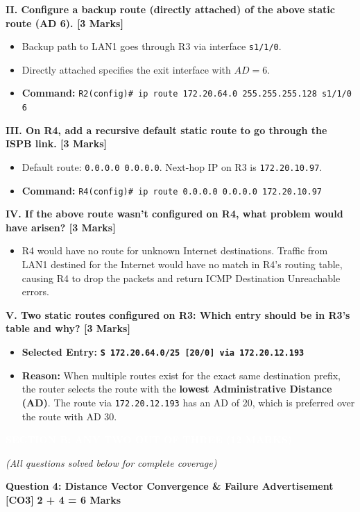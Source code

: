 \documentclass[11pt,a4paper]{article}
\newcommand{\questionheader}[3]{
    \vspace{0.35cm}
    \noindent\colorbox{qboxbg}{
        \parbox{\dimexpr\textwidth-2\fboxsep\relax}{
            \textbf{\textcolor{primary}{\large #1}} \hfill \textbf{\textcolor{accent}{[#2]}} \hfill \textbf{\textcolor{secondary}{#3 Marks}}
        }
    }
    \vspace{0.15cm}
}
\newcommand{\sectionbanner}[1]{
    \vspace{0.5cm}
    \noindent\colorbox{primary}{
        \parbox{\dimexpr\textwidth-2\fboxsep\relax}{
            \centering \textbf{\textcolor{white}{\Large #1}}
        }
    }
    \vspace{0.25cm}
}
\begin{document}
\textbf{II. Configure a backup route (directly attached) of the above static route (AD 6). [3 Marks]}
\begin{itemize}
    \item Backup path to LAN1 goes through R3 via interface \texttt{s1/1/0}.
    \item Directly attached specifies the exit interface with $AD = 6$.
    \item \textbf{Command:} \texttt{R2(config)\# ip route 172.20.64.0 255.255.255.128 s1/1/0 6}
\end{itemize}

\textbf{III. On R4, add a recursive default static route to go through the ISPB link. [3 Marks]}
\begin{itemize}
    \item Default route: \texttt{0.0.0.0 0.0.0.0}. Next-hop IP on R3 is \texttt{172.20.10.97}.
    \item \textbf{Command:} \texttt{R4(config)\# ip route 0.0.0.0 0.0.0.0 172.20.10.97}
\end{itemize}

\textbf{IV. If the above route wasn't configured on R4, what problem would have arisen? [3 Marks]}
\begin{itemize}
    \item R4 would have no route for unknown Internet destinations. Traffic from LAN1 destined for the Internet would have no match in R4's routing table, causing R4 to drop the packets and return ICMP Destination Unreachable errors.
\end{itemize}

\textbf{V. Two static routes configured on R3: Which entry should be in R3's table and why? [3 Marks]}
\begin{itemize}
    \item \textbf{Selected Entry:} \textbf{\texttt{S 172.20.64.0/25 [20/0] via 172.20.12.193}}
    \item \textbf{Reason:} When multiple routes exist for the exact same destination prefix, the router selects the route with the \textbf{lowest Administrative Distance (AD)}. The route via \texttt{172.20.12.193} has an AD of 20, which is preferred over the route with AD 30.
\end{itemize}

\newpage
\sectionbanner{SECTION B: ANY TWO OUT OF THREE (12 MARKS)}
\textit{(All questions solved below for complete coverage)}

\questionheader{Question 4: Distance Vector Convergence \& Failure Advertisement}{CO3}{2 + 4 = 6}
\end{document}
